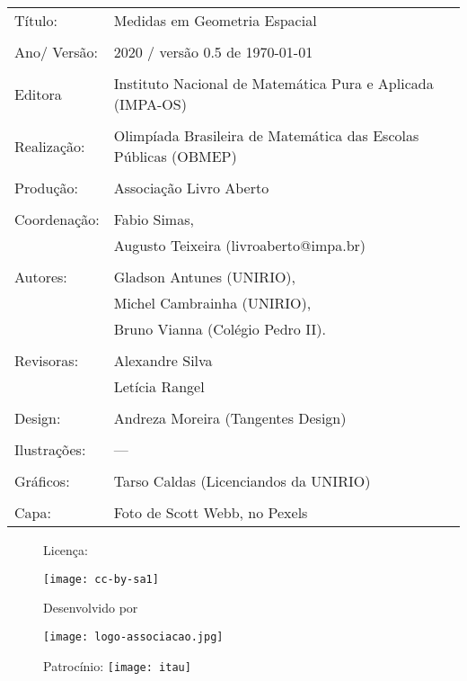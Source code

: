\begin{tabular}{p{}p{}}
Título: & Medidas em Geometria Espacial\\
\\
Ano/ Versão: & 2020 / versão 0.5 de \today\\
\\
Editora & Instituto Nacional de Matem\'atica Pura e Aplicada (IMPA-OS)\\
\\
Realização:& Olimp\'iada Brasileira de Matem\'atica das Escolas P\'ublicas (OBMEP)\\
\\
Produção:& Associação Livro Aberto\\
\\
Coordenação:& Fabio Simas, \\
   			& Augusto Teixeira (livroaberto@impa.br)\\
\\
Autores: & Gladson Antunes (UNIRIO),\\
         & Michel Cambrainha (UNIRIO),\\
         & Bruno Vianna (Colégio Pedro II).\\
\\
Revisoras: &  Alexandre Silva  \\
           &  Letícia Rangel \\
\\
Design: & Andreza Moreira (Tangentes Design) \\
\\
  Ilustrações: & --- \\ 
\\
Gráficos: & Tarso Caldas (Licenciandos da UNIRIO)\\
\\
  Capa: & Foto de Scott Webb, no Pexels \\

\end{tabular}



\begin{figure}[b]
\begin{minipage}[l]{5cm}
\centering

{\large Licença:}

  \texttt{[image: cc-by-sa1]}
\end{minipage}\hfill
\begin{minipage}[c]{5cm}
\centering
{\large Desenvolvido por}

\texttt{[image: logo-associacao.jpg]}
\end{minipage}
\begin{minipage}[r]{5cm}
\centering

{\large Patrocínio:}
  \vspace{1em}
  \texttt{[image: itau]}
\end{minipage}
\end{figure}

